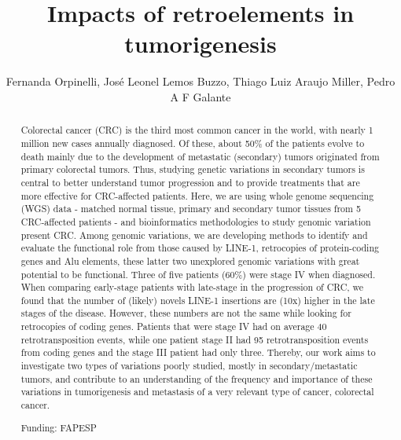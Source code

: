 \documentclass[twoside]{article}
\title{\vspace{-15mm}\fontsize{24pt}{10pt}\selectfont\textbf{ Impacts of retroelements in tumorigenesis }} %
\author{ Fernanda Orpinelli, Jos\'e Leonel Lemos Buzzo, Thiago Luiz Araujo Miller, Pedro A F Galante }
\affil{ USP }
\date{}
\begin{document}
  
  
  \maketitle %
  
  
  \thispagestyle{fancy} %
  
  
  \begin{abstract}
  Colorectal cancer (CRC) is the third most common cancer in the world,  with nearly 1 million new cases annually diagnosed. Of these,  about 50\% of the patients evolve to death mainly due to the development of metastatic (secondary) tumors originated from primary colorectal tumors. Thus,  studying genetic variations in secondary tumors is central to better understand tumor progression and to provide treatments that are more effective for CRC-affected patients. Here,  we are using whole genome sequencing (WGS) data - matched normal tissue,  primary and secondary tumor tissues from 5 CRC-affected patients - and bioinformatics methodologies to study genomic variation present CRC. Among genomic variations,  we are developing methods to identify and evaluate the functional role from those caused by LINE-1,  retrocopies of protein-coding genes and Alu elements,  these latter two unexplored genomic variations with great potential to be functional. Three of five patients (60\%) were stage IV when diagnosed. When comparing early-stage patients with late-stage in the progression of CRC,  we found that the number of (likely) novels LINE-1 insertions are (10x) higher in the late stages of the disease. However,  these numbers are not the same while looking for retrocopies of coding genes. Patients that were stage IV had on average 40 retrotransposition events,  while one patient stage II had 95 retrotransposition events from coding genes and the stage III patient had only three. Thereby,  our work aims to investigate two types of variations poorly studied,  mostly in secondary/metastatic tumors,  and contribute to an understanding of the frequency and importance of these variations in tumorigenesis and metastasis of a very relevant type of cancer,  colorectal cancer.
  
  Funding: FAPESP \\ 
  \end{abstract}
  
\end{document}
